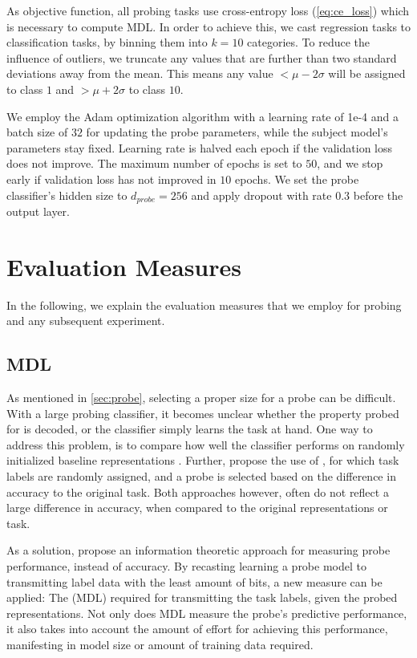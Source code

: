 As objective function, all probing tasks use cross-entropy loss (\autoref{eq:ce_loss}) which is necessary to compute MDL. In order to achieve this, we cast regression tasks to classification tasks, by binning them into $k=10$ categories. To reduce the influence of outliers, we truncate any values that are further than two standard deviations away from the mean. This means any value $< \mu - 2 \sigma$ will be assigned to class $1$ and $> \mu + 2 \sigma$ to class $10$.

We employ the Adam optimization algorithm \cite{kingma2014adam} with a learning rate of 1e-4 and a batch size of $32$ for updating the probe parameters, while the subject model's parameters stay fixed. Learning rate is halved each epoch if the validation loss does not improve. The maximum number of epochs is set to $50$, and we stop early if validation loss has not improved in $10$ epochs. We set the probe classifier's hidden size to $d_{probe}=256$ and apply dropout with rate $0.3$ before the output layer.

\section{Evaluation Measures}
In the following, we explain the evaluation measures that we employ for probing and any subsequent experiment.

\subsection{MDL}
As mentioned in \autoref{sec:probe}, selecting a proper size for a probe can be difficult. With a large probing classifier, it becomes unclear whether the property probed for is decoded, or the classifier simply learns the task at hand. One way to address this problem, is to compare how well the classifier performs on randomly initialized baseline representations \cite{zhang-bowman-2018-language}. Further, \cite{DBLP:journals/corr/abs-1909-03368} propose the use of , for which task labels are randomly assigned, and a probe is selected based on the difference in accuracy to the original task. Both approaches however, often do not reflect a large difference in accuracy, when compared to the original representations or task.

As a solution, \cite{voita-titov-2020-information} propose an information theoretic approach for measuring probe performance, instead of accuracy. By recasting learning a probe model to transmitting label data with the least amount of bits, a new measure can be applied: The  (MDL) required for transmitting the task labels, given the probed representations. Not only does MDL measure the probe's predictive performance, it also takes into account the amount of effort for achieving this performance, manifesting in model size or amount of training data required.

